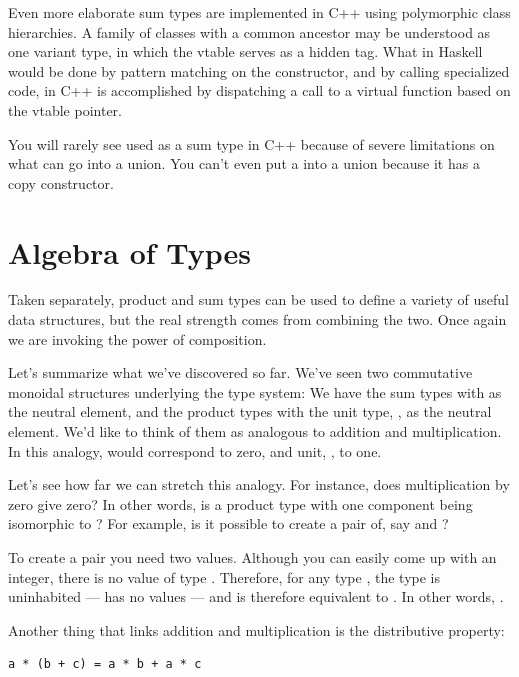 Even more elaborate sum types are implemented in C++ using polymorphic
class hierarchies. A family of classes with a common ancestor may be
understood as one variant type, in which the vtable serves as a hidden
tag. What in Haskell would be done by pattern matching on the
constructor, and by calling specialized code, in C++ is accomplished by
dispatching a call to a virtual function based on the vtable pointer.

You will rarely see  used as a sum type in C++ because of
severe limitations on what can go into a union. You can't even put a
 into a union because it has a copy constructor.

\section{Algebra of Types}\label{algebra-of-types}

Taken separately, product and sum types can be used to define a variety
of useful data structures, but the real strength comes from combining
the two. Once again we are invoking the power of composition.

Let's summarize what we've discovered so far. We've seen two commutative
monoidal structures underlying the type system: We have the sum types
with  as the neutral element, and the product types with
the unit type, \code{()}, as the neutral element. We'd like to think
of them as analogous to addition and multiplication. In this analogy,
 would correspond to zero, and unit, \code{()}, to one.

Let's see how far we can stretch this analogy. For instance, does
multiplication by zero give zero? In other words, is a product type with
one component being  isomorphic to ? For
example, is it possible to create a pair of, say  and
?

To create a pair you need two values. Although you can easily come up
with an integer, there is no value of type . Therefore, for
any type , the type  is uninhabited --- has
no values --- and is therefore equivalent to . In other
words, .

Another thing that links addition and multiplication is the distributive
property:

\begin{verbatim}
a * (b + c) = a * b + a * c
\end{verbatim}

